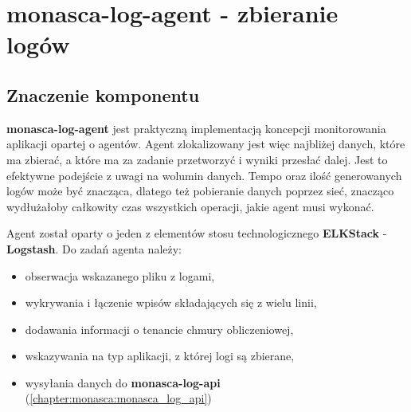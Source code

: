 \section{monasca-log-agent - zbieranie logów}
\label{chapter:monasca:monasca_log_agent}

    \subsection{Znaczenie komponentu}
    \textbf{monasca-log-agent} jest praktyczną implementacją koncepcji monitorowania aplikacji opartej o agentów.
    Agent zlokalizowany jest więc najbliżej danych, które ma zbierać, a które ma za zadanie przetworzyć i wyniki
    przesłać dalej. Jest to efektywne podejście z uwagi na wolumin danych. Tempo oraz ilość generowanych logów
    może być znacząca, dlatego też pobieranie danych poprzez sieć, znacząco wydłużałoby całkowity czas 
    wszystkich operacji, jakie agent musi wykonać.
    
    Agent został oparty o jeden z elementów stosu technologicznego \textbf{ELKStack} - \textbf{Logstash}.
    Do zadań agenta należy:
    \begin{itemize}
        \item obserwacja wskazanego pliku z logami,
        \item wykrywania i łączenie wpisów składających się z wielu linii,
        \item dodawania informacji o tenancie chmury obliczeniowej,
        \item wskazywania na typ aplikacji, z której logi są zbierane,
        \item wysyłania danych do \textbf{monasca-log-api} (\ref{chapter:monasca:monasca_log_api})
    \end{itemize}
    
